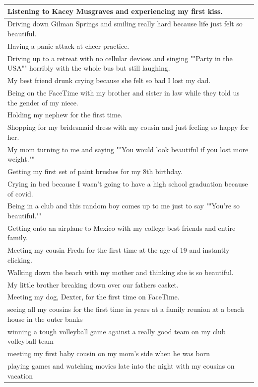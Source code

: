 \documentclass[
  .7em,
  letterpaper,
  DIV=11,
  numbers=noendperiod]{scrartcl}
\begin{document}
\begin{table}
\begin{tabular}{l}
\hline
Listening to Kacey Musgraves and experiencing my first kiss.\\
\hline
Driving down Gilman Springs and smiling really hard because life just felt so beautiful.\\
\hline
Having a panic attack at cheer practice.\\
\hline
Driving up to a retreat with no cellular devices and singing ""Party in the USA"" horribly with the whole bus but still laughing.\\
\hline
My best friend drunk crying because she felt so bad I lost my dad.\\
\hline
Being on the FaceTime with my brother and sister in law while they told us the gender of my niece.\\
\hline
Holding my nephew for the first time.\\
\hline
Shopping for my bridesmaid dress with my cousin and just feeling so happy for her.\\
\hline
My mom turning to me and saying ""You would look beautiful if you lost more weight.""\\
\hline
Getting my first set of paint brushes for my 8th birthday.\\
\hline
Crying in bed because I wasn't going to have a high school graduation because of covid.\\
\hline
Being in a club and this random boy comes up to me just to say ""You're so beautiful.""\\
\hline
Getting onto an airplane to Mexico with my college best friends and entire family.\\
\hline
Meeting my cousin Freda for the first time at the age of 19 and instantly clicking.\\
\hline
Walking down the beach with my mother and thinking she is so beautiful.\\
\hline
My little brother breaking down over our fathers casket.\\
\hline
Meeting my dog, Dexter, for the first time on FaceTime.\\
\hline
seeing all my cousins for the first time in years at a family reunion at a beach house in the outer banks\\
\hline
winning a tough volleyball game against a really good team on my club volleyball team\\
\hline
meeting my first baby cousin on my mom's side when he was born\\
\hline
playing games and watching movies late into the night with my cousins on vacation\\

\end{tabular}
\end{table}
\end{document}
